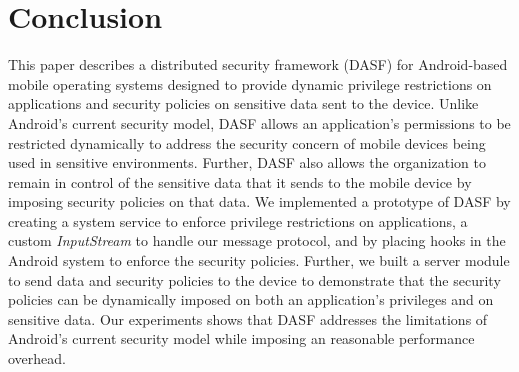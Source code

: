 \section{Conclusion}

This paper describes a distributed security framework (DASF) for
Android-based mobile operating systems designed
to provide dynamic privilege restrictions on 
applications and security policies on sensitive
data sent to the device.  Unlike Android's
current security model, DASF
allows an application's permissions to be
restricted dynamically to address
the security concern of mobile devices being
used in sensitive environments.  Further,
DASF also allows the organization
to remain in control of the sensitive data that it
sends to the mobile device by imposing security
policies on that data.  We implemented a
prototype of DASF by creating
a system service to enforce privilege restrictions
on applications, a custom \textit{InputStream} to 
handle our message protocol, and by
placing hooks in the Android system to enforce
the security policies.  Further, we built a server
module to send data and security policies to
the device to demonstrate that the security
policies can be dynamically imposed on both
an application's privileges and on sensitive
data.  Our experiments shows that DASF
addresses the limitations of
Android's current security model while
imposing an reasonable performance overhead.
